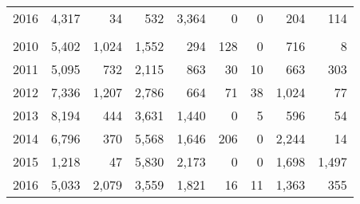 \documentclass[]{article}
\begin{document}
\begin{table}
\begin{tabular}[t]{lrrrrrrrr}
\hspace{1em}\hspace{1em}\hspace{1em}\hspace{1em}2016 & 4,317 & 34 & 532 & 3,364 & 0 & 0 & 204 & 114\\
\addlinespace[0.3em]
\multicolumn{9}{l}{\textbf{Cape Simpson}}\\
\hspace{1em}\hspace{1em}\hspace{1em}\hspace{1em}2010 & 5,402 & 1,024 & 1,552 & 294 & 128 & 0 & 716 & 8\\
\hspace{1em}\hspace{1em}\hspace{1em}\hspace{1em}2011 & 5,095 & 732 & 2,115 & 863 & 30 & 10 & 663 & 303\\
\hspace{1em}\hspace{1em}\hspace{1em}\hspace{1em}2012 & 7,336 & 1,207 & 2,786 & 664 & 71 & 38 & 1,024 & 77\\
\hspace{1em}\hspace{1em}\hspace{1em}\hspace{1em}2013 & 8,194 & 444 & 3,631 & 1,440 & 0 & 5 & 596 & 54\\
\hspace{1em}\hspace{1em}\hspace{1em}\hspace{1em}2014 & 6,796 & 370 & 5,568 & 1,646 & 206 & 0 & 2,244 & 14\\
\hspace{1em}\hspace{1em}\hspace{1em}\hspace{1em}2015 & 1,218 & 47 & 5,830 & 2,173 & 0 & 0 & 1,698 & 1,497\\
\hspace{1em}\hspace{1em}\hspace{1em}\hspace{1em}2016 & 5,033 & 2,079 & 3,559 & 1,821 & 16 & 11 & 1,363 & 355\\
\bottomrule
\end{tabular}
\end{table}
\end{document}
